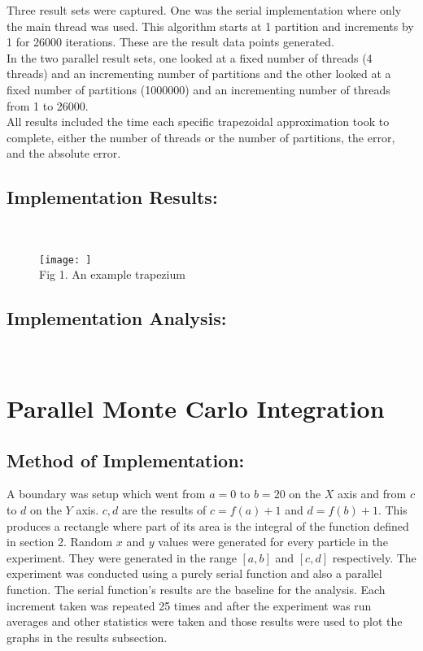 \documentclass[11pt]{article}
\begin{document}
\begin{page}
\noindent Three result sets were captured. One was the serial implementation where only the main thread was used. This algorithm starts at 1 partition and increments by 1 for 26000 iterations. These are the result data points generated.\\

\noindent In the two parallel result sets, one looked at a fixed number of threads (4 threads) and an incrementing number of partitions and the other looked at a fixed number of partitions (1000000) and an incrementing number of threads from 1 to 26000.\\

\noindent All results included the time each specific trapezoidal approximation took to complete, either the number of threads or the number of partitions, the error, and the absolute error.

\subsection{Implementation Results:}\\
\begin{figure}[ht]
\centering
     \texttt{[image: ]}\\
     Fig 1. An example trapezium
\end{figure}

\subsection{Implementation Analysis:}\\

\section{Parallel Monte Carlo Integration}
\subsection{Method of Implementation:}
\noindent A boundary was setup which went from $a = 0$ to $b = 20$ on the $X$ axis and from $c$ to $d$ on the $Y$ axis. $c,d$ are the results of $c = f(a) + 1$ and $d = f(b) + 1$. This produces a rectangle where part of its area is the integral of the function defined in section 2. Random $x$ and $y$ values were generated for every particle in the experiment. They were generated in the range $[a,b]$ and $[c,d]$ respectively. The experiment was conducted using a purely serial function and also a parallel function. The serial function's results are the baseline for the analysis. Each increment taken was repeated 25 times and after the experiment was run averages and other statistics were taken and those results were used to plot the graphs in the results subsection.\\


\end{page}
\end{document}
